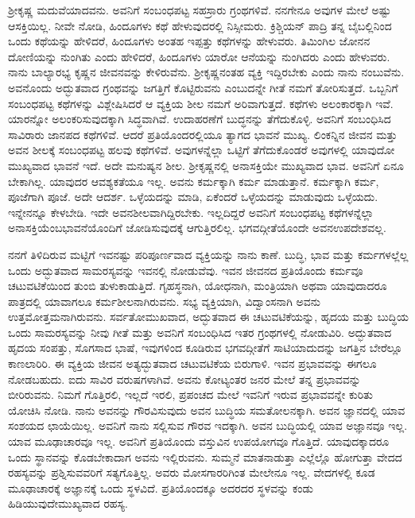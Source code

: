 ಶ‍್ರೀಕೃಷ್ಣ ಮದುವೆಯಾದವನು. ಅವನಿಗೆ ಸಂಬಂಧಪಟ್ಟ ಸಹಸ್ರಾರು ಗ್ರಂಥಗಳಿವೆ. ನನಗೇನೂ ಅವುಗಳ ಮೇಲೆ ಅಷ್ಟು ಆಸಕ್ತಿಯಿಲ್ಲ. ನೀವೇ ನೋಡಿ, ಹಿಂದೂಗಳು ಕಥೆ ಹೇಳುವುದರಲ್ಲಿ ನಿಸ್ಸೀಮರು. ಕ್ರಿಶ್ಚಿಯನ್​ ಪಾದ್ರಿ ತನ್ನ ಬೈಬಲ್ಲಿನಿಂದ ಒಂದು ಕಥೆಯನ್ನು ಹೇಳಿದರೆ, ಹಿಂದೂಗಳು ಅಂತಹ ಇಪ್ಪತ್ತು ಕಥೆಗಳನ್ನು ಹೇಳುವರು. ತಿಮಿಂಗಿಲ ಜೋನನ ದೋಣಿಯನ್ನು ನುಂಗಿತು ಎಂದು ಹೇಳಿದರೆ, ಹಿಂದೂಗಳು ಯಾರೋ ಆನೆಯನ್ನು ನುಂಗಿದರು ಎಂದು ಹೇಳುವರು. ನಾನು ಬಾಲ್ಯಾರಭ್ಯ ಕೃಷ್ಣನ ಜೀವನವನ್ನು ಕೇಳಿರುವೆನು. ಶ‍್ರೀಕೃಷ್ಣನಂತಹ ವ್ಯಕ್ತಿ ಇದ್ದಿರಬೇಕು ಎಂದು ನಾನು ನಂಬುವೆನು. ಅವನೊಂದು ಅದ್ಭುತವಾದ ಗ್ರಂಥವನ್ನು ಜಗತ್ತಿಗೆ ಕೊಟ್ಟಿರುವನು ಎಂಬುದನ್ನೇ ಗೀತೆ ನಮಗೆ ತೋರಿಸುತ್ತದೆ. ಒಬ್ಬನಿಗೆ ಸಂಬಂಧಪಟ್ಟ ಕಥೆಗಳನ್ನು ವಿಶ್ಲೇಷಿಸಿದರೆ ಆ ವ್ಯಕ್ತಿಯ ಶೀಲ ನಮಗೆ ಅರಿವಾಗುತ್ತದೆ. ಕಥೆಗಳು ಅಲಂಕಾರಕ್ಕಾಗಿ ಇವೆ. ಯಾರನ್ನೋ ಅಲಂಕರಿಸುವುದಕ್ಕಾಗಿ ಸಿದ್ಧವಾಗಿವೆ. ಉದಾಹರಣೆಗೆ ಬುದ್ಧನನ್ನು ತೆಗೆದುಕೊಳ್ಳಿ. ಅವನಿಗೆ ಸಂಬಂಧಿಸಿದ ಸಾವಿರಾರು ಜಾನಪದ ಕಥೆಗಳಿವೆ. ಆದರೆ ಪ್ರತಿಯೊಂದರಲ್ಲಿಯೂ ತ್ಯಾಗದ ಭಾವನೆ ಮುಖ್ಯ. ಲಿಂಕನ್ನಿನ ಜೀವನ ಮತ್ತು ಅವನ ಶೀಲಕ್ಕೆ ಸಂಬಂಧಪಟ್ಟ ಹಲವು ಕಥೆಗಳಿವೆ. ಅವುಗಳನ್ನೆಲ್ಲಾ ಒಟ್ಟಿಗೆ ತೆಗೆದುಕೊಂಡರೆ ಅವುಗಳಲ್ಲಿ ಯಾವುದೋ ಮುಖ್ಯವಾದ ಭಾವನೆ ಇದೆ. ಅದೇ ಮನುಷ್ಯನ ಶೀಲ. ಶ‍್ರೀಕೃಷ್ಣನಲ್ಲಿ ಅನಾಸಕ್ತಿಯೇ ಮುಖ್ಯವಾದ ಭಾವ. ಅವನಿಗೆ ಏನೂ ಬೇಕಾಗಿಲ್ಲ. ಯಾವುದರ ಆವಶ್ಯಕತೆಯೂ ಇಲ್ಲ. ಅವನು ಕರ್ಮಕ್ಕಾಗಿ ಕರ್ಮ ಮಾಡುತ್ತಾನೆ. ಕರ್ಮಕ್ಕಾಗಿ ಕರ್ಮ, ಪೂಜೆಗಾಗಿ ಪೂಜೆ. ಅದೇ ಆದರ್ಶ. ಒಳ್ಳೆಯದನ್ನು ಮಾಡಿ, ಏಕೆಂದರೆ ಒಳ್ಳೆಯದನ್ನು ಮಾಡುವುದು ಒಳ್ಳೆಯದು. ಇನ್ನೇನನ್ನೂ ಕೇಳಬೇಡಿ. ಇದೇ ಅವನ\break ಶೀಲವಾಗಿದ್ದಿರಬೇಕು. ಇಲ್ಲದಿದ್ದರೆ ಅವನಿಗೆ ಸಂಬಂಧಪಟ್ಟ ಕಥೆಗಳನ್ನೆಲ್ಲಾ ಅನಾಸಕ್ತಿಯೆಂಬ\break ಭಾವನೆಯೊಂದಿಗೆ ಜೋಡಿಸುವುದಕ್ಕೆ ಆಗುತ್ತಿರಲಿಲ್ಲ. ಭಗವದ್ಗೀತೆಯೊಂದೇ ಅವನ\break ಉಪದೇಶವಲ್ಲ.

ನನಗೆ ತಿಳಿದಿರುವ ಮಟ್ಟಿಗೆ ಇವನಷ್ಟು ಪರಿಪೂರ್ಣವಾದ ವ್ಯಕ್ತಿಯನ್ನು ನಾನು ಕಾಣೆ. ಬುದ್ಧಿ, ಭಾವ ಮತ್ತು ಕರ್ಮಗಳಲ್ಲೆಲ್ಲ ಒಂದು ಅದ್ಭುತವಾದ ಸಾಮರಸ್ಯವನ್ನು ಇವನಲ್ಲಿ ನೋಡುವೆವು. ಇವನ ಜೀವನದ ಪ್ರತಿಯೊಂದು ಕರ್ಮವೂ ಚಟುವಟಿಕೆಯಿಂದ ತುಂಬಿ ತುಳುಕಾಡುತ್ತಿದೆ. ಗೃಹಸ್ಥನಾಗಿ, ಯೋಧನಾಗಿ, ಮಂತ್ರಿಯಾಗಿ ಅಥವಾ ಯಾವುದಾದರೂ ಪಾತ್ರದಲ್ಲಿ ಯಾವಾಗಲೂ ಕರ್ಮಶೀಲನಾಗಿರುವನು. ಸಭ್ಯ ವ್ಯಕ್ತಿಯಾಗಿ, ವಿದ್ವಾಂಸನಾಗಿ ಅವನು ಉತ್ತಮೋತ್ತಮನಾಗಿರುವನು. ಸರ್ವತೋಮುಖವಾದ, ಅದ್ಭುತವಾದ ಈ ಚಟುವಟಿಕೆಯನ್ನು, ಹೃದಯ ಮತ್ತು ಬುದ್ಧಿಯ ಒಂದು ಸಾಮರಸ್ಯವನ್ನು ನೀವು ಗೀತೆ ಮತ್ತು ಅವನಿಗೆ ಸಂಬಂಧಿಸಿದ ಇತರ ಗ್ರಂಥಗಳಲ್ಲಿ ನೋಡುವಿರಿ. ಅದ್ಭುತವಾದ ಹೃದಯ ಸಂಪತ್ತು, ಸೊಗಸಾದ ಭಾಷೆ, ಇವುಗಳಿಂದ ಕೂಡಿರುವ ಭಗವದ್ಗೀತೆಗೆ ಸಾಟಿಯಾದುದನ್ನು ಜಗತ್ತಿನ ಬೇರೆಲ್ಲೂ ಕಾಣಲಾರಿರಿ. ಈ ವ್ಯಕ್ತಿಯ ಜೀವನ ಅತ್ಯದ್ಭುತವಾದ ಚಟುವಟಿಕೆಯ ಬಿರುಗಾಳಿ. ಇವನ ಪ್ರಭಾವವನ್ನು ಈಗಲೂ ನೋಡಬಹುದು. ಐದು ಸಾವಿರ ವರುಷಗಳಾಗಿವೆ. ಅವನು ಕೋಟ್ಯಂತರ ಜನರ ಮೇಲೆ ತನ್ನ ಪ್ರಭಾವವನ್ನು ಬೀರಿರುವನು. ನಿಮಗೆ ಗೊತ್ತಿರಲಿ, ಇಲ್ಲದೆ ಇರಲಿ, ಪ್ರಪಂಚದ ಮೇಲೆ ಇವನಿಗೆ ಇರುವ ಪ್ರಭಾವವನ್ನೇ ಕುರಿತು ಯೋಚಿಸಿ ನೋಡಿ. ನಾನು ಅವನನ್ನು ಗೌರವಿಸುವುದು ಅವನ ಬುದ್ಧಿಯ ಸಮತೋಲನಕ್ಕಾಗಿ. ಅವನ ಜ್ಞಾನದಲ್ಲಿ ಯಾವ ಸಂಶಯದ ಛಾಯೆಯಿಲ್ಲ. ಅವನಿಗೆ ನಾನು ಸಲ್ಲಿಸುವ ಗೌರವ ಇದಕ್ಕಾಗಿ. ಅವನ ಬುದ್ಧಿಯಲ್ಲಿ ಯಾವ ಅಜ್ಞಾನವೂ ಇಲ್ಲ. ಯಾವ ಮೂಢಾಚಾರವೂ ಇಲ್ಲ. ಅವನಿಗೆ ಪ್ರತಿಯೊಂದು ವಸ್ತುವಿನ ಉಪಯೋಗವೂ ಗೊತ್ತಿದೆ. ಯಾವುದಕ್ಕಾದರೂ ಒಂದು ಸ್ಥಾನವನ್ನು ಕೊಡಬೇಕಾದಾಗ ಅವನು ಇಲ್ಲಿರುವನು. ಸುಮ್ಮನೆ ಮಾತನಾಡುತ್ತಾ ಎಲ್ಲೆಲ್ಲೊ ಹೋಗುತ್ತಾ ವೇದದ ರಹಸ್ಯವನ್ನು ಪ್ರಶ್ನಿಸುವವರಿಗೆ ಸತ್ಯಗೊತ್ತಿಲ್ಲ. ಅವರು ಮೋಸಗಾರರಿಗಿಂತ ಮೇಲೇನೂ ಇಲ್ಲ. ವೇದಗಳಲ್ಲಿ ಕೂಡ ಮೂಢಾಚಾರಕ್ಕೆ ಅಜ್ಞಾನಕ್ಕೆ ಒಂದು ಸ್ಥಳವಿದೆ. ಪ್ರತಿಯೊಂದಕ್ಕೂ ಅದರದರ ಸ್ಥಳವನ್ನು ಕಂಡು ಹಿಡಿಯುವುದೇ\break ಮುಖ್ಯವಾದ ರಹಸ್ಯ.

